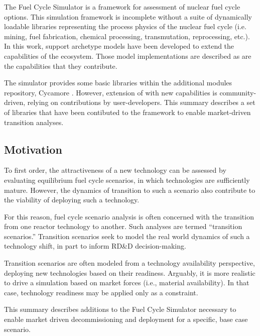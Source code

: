 
The \Cyclus Fuel Cycle Simulator \cite{carlsen_cyclus_2014} is a framework for 
assessment of nuclear fuel cycle options. This simulation framework is 
incomplete without a suite of dynamically loadable libraries representing the 
process physics of the nuclear fuel cycle (i.e. mining, fuel fabrication, 
chemical processing, transmutation, reprocessing, etc.).  In this work, support 
archetype models have been developed to extend the capabilities of the \Cyclus 
ecosystem. Those model implementations are described as are the capabilities 
that they contribute. 

The \Cyclus simulator provides some basic libraries within the additional 
modules repository, Cycamore \cite{carlsen_cyclus_2014}. However, extension of 
\Cyclus with new capabilities is community-driven, relying on contributions by 
user-developers.  This summary describes a set of libraries that have been 
contibuted to the \Cyclus framework to enable market-driven transition analyses. 

\subsection{Motivation}

To first order, the attractiveness of a new technology can be assessed by 
evaluating equilibrium fuel cycle scenarios, in which technologies are 
sufficiently mature. However, the dynamics of transition to such a scenario also 
contribute to the viability of deploying such a technology. 

For this reason, fuel cycle scenario analysis is often concerned with the 
transition from one reactor technology to another. Such analyses are termed 
``transition scenarios.''  Transition scenarios seek to model the real world 
dynamics of such a technology shift, in part to inform RD\&D decision-making. 

Transition scenarios are often modeled from a technology availability 
perspective, deploying new technologies based on their readiness.  Arguably, it 
is more realistic to drive a simulation based on market forces (i.e., material 
availability). In that case, technology readiness may be applied only as a 
constraint. 

This summary describes additions to the \Cyclus Fuel Cycle Simulator necessary 
to enable market driven decommissioning and deployment for a specific, base 
case scenario.  

